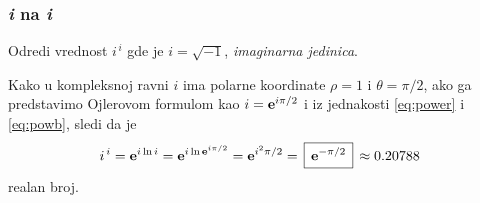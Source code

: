 \subsubsection{\textit{i} na \textit{i}}

\zadatak Odredi vrednost $i^{\,i}$ gde je $i=\sqrt{-1}$, {\sl imaginarna jedinica}.

\resenje
Kako u kompleksnoj ravni $i$ ima polarne koordinate $\rho=1$ i $\theta=\pi/2$, ako ga predstavimo Ojlerovom formulom kao
$i={\bf e}^{i\pi/2}$ i iz jednakosti \eqref{eq:power} i \eqref{eq:powb}, sledi da je
$$
i^{\,i}=\e^{i\ln i} = \e^{i\ln \e^{i\pi/2}}=\e^{i^2\pi/2}=\ram{\e^{-\pi/2}}\approx0.20788 
$$
realan broj.
